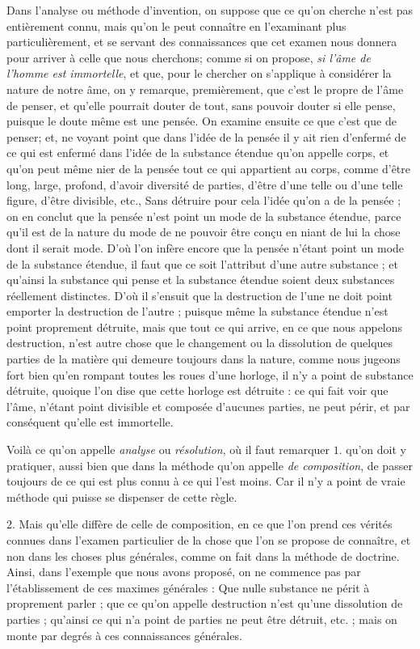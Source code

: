 Dans l'analyse ou méthode d'invention, on suppose que ce qu'on cherche n'est pas entièrement connu, mais qu'on le peut connaître en l'examinant plus particulièrement, et se servant des connaissances que cet examen nous donnera pour arriver à celle que nous cherchons; comme si on propose, \emph{si l'âme de l'homme est immortelle}, et que, pour le chercher on s'applique à considérer la nature de notre âme, on y remarque, premièrement, que c'est le propre de l'âme de penser, et qu'elle pourrait douter de tout, sans pouvoir douter si elle pense, puisque le doute même est une pensée. On examine ensuite ce que c'est que de penser; et, ne voyant point que dans l'idée de la pensée il y ait rien d'enfermé de ce qui est enfermé dans l'idée de la substance étendue qu'on appelle corps, et qu'on peut même nier de la pensée tout ce qui appartient au corps, comme d'être long, large, profond, d'avoir diversité de parties, d'être d'une telle ou d'une telle figure, d'être divisible, etc., Sans détruire pour cela l'idée qu'on a de la pensée ; on en conclut que la pensée n'est point un mode de la substance étendue, parce qu'il est de la nature du mode de ne pouvoir être conçu en niant de lui la chose dont il serait mode. D'où l'on infère encore que la pensée n'étant point un mode de la substance étendue, il faut que ce soit l'attribut d'une autre substance ; et qu'ainsi la substance qui pense et la substance étendue soient deux substances réellement distinctes. D'où il s'ensuit que la destruction de l'une ne doit point emporter la destruction de l'autre ; puisque même la substance étendue n'est point proprement détruite, mais que tout ce qui arrive, en ce que nous appelons destruction, n'est autre chose que le changement ou la dissolution de quelques parties de la matière qui demeure toujours dans la nature, comme nous jugeons fort bien qu'en rompant toutes les roues d'une horloge, il n'y a point de substance détruite, quoique l'on dise que cette horloge est détruite : ce qui fait voir que l'âme, n'étant point divisible et composée d'aucunes parties, ne peut périr, et par conséquent qu'elle est immortelle.

Voilà ce qu'on appelle \emph{analyse} ou \emph{résolution}, où il faut remarquer $1$. qu'on doit y pratiquer, aussi bien que dans la méthode qu'on appelle \emph{de composition}, de passer toujours de ce qui est plus connu à ce qui l'est moins. Car il n'y a point de vraie méthode qui puisse se dispenser de cette règle.

$2$. Mais qu'elle diffère de celle de composition, en ce que l'on prend ces vérités connues dans l'examen particulier de la chose que l'on se propose de connaître, et non dans les choses plus générales, comme on fait dans la méthode de doctrine. Ainsi, dans l'exemple que nous avons proposé, on ne commence pas par l'établissement de ces maximes générales : Que nulle substance ne périt à proprement parler ; que ce qu'on appelle destruction n'est qu'une dissolution de parties ; qu'ainsi ce qui n'a point de parties ne peut être détruit, etc. ; mais on monte par degrés à ces connaissances générales.

